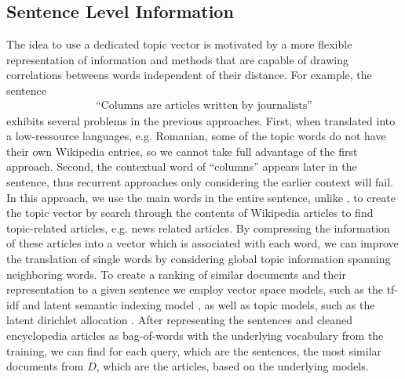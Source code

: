 \documentclass[a4paper]{article}
\begin{document}
\subsection{Sentence Level Information} \label{sec:sentence-level}
The idea to use a dedicated topic vector is motivated by a more flexible representation of information and methods that are capable of drawing correlations betweens words independent of their distance.
For example, the sentence 
\begin{align}
\text{``Columns are articles written by journalists''}
\end{align}
exhibits several problems in the previous approaches. First, when translated into a low-ressource languages, e.g. Romanian, some of the topic words do not have their own Wikipedia entries, so we cannot take full advantage of the first approach. Second, the contextual word of ``columns'' appears later in the sentence, thus recurrent approaches only considering the earlier context will fail. 
In this approach, we use the main words in the entire sentence, unlike \cite{mikolov2012context}, to create the topic vector by search through the contents of Wikipedia articles to find topic-related articles, e.g. news related articles. By compressing the information of these articles into a vector which is associated with each word, we can improve the translation of single words by considering global topic information spanning neighboring words. 
To create a ranking of similar documents and their representation to a given sentence we employ vector space models, such as the tf-idf \cite{salton1986introduction} and latent semantic indexing model \cite{bradford2008empirical}, as well as topic models, such as the latent dirichlet allocation \cite{blei2003latent}. After representing the sentences and cleaned encyclopedia articles as bag-of-words with the underlying vocabulary from the training, we can find for each query, which are the sentences, the most similar documents from $D$, which are the articles,  based on the underlying models.
\end{document}
